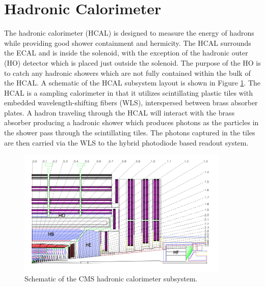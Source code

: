 \section{Hadronic Calorimeter}
\label{sec:hcal}
The hadronic calorimeter (HCAL) is designed to measure the energy of hadrons while providing good shower containment and hermicity.
The HCAL surrounds the ECAL and is inside the solenoid, with the exception of the hadronic outer (HO) detector which is placed just outside the solenoid.
The purpose of the HO is to catch any hadronic showers which are not fully contained within the bulk of the HCAL.
A schematic of the HCAL subsystem layout is shown in Figure \ref{fig:hcallayout}.
The HCAL is a sampling calorimeter in that it utilizes scintillating plastic tiles with embedded wavelength-shifting fibers (WLS), interspersed between brass absorber plates.
A hadron traveling through the HCAL will interact with the brass absorber producing a hadronic shower which produces photons as the particles in the shower pass through the scintillating tiles.
The photons captured in the tiles are then carried via the WLS to the hybrid photodiode based readout system.
\begin{figure}[htpb]
\begin{center}
\includegraphics[width=0.9\textwidth]{plots/hcallayout.png}
\caption{Schematic of the CMS hadronic calorimeter subsystem\cite{CMS_DETECTOR}.}
\label{fig:hcallayout}
\end{center}
\end{figure}

